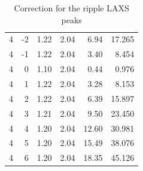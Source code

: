 \begin{table}[htbp]
\begin{tabular}{rrrrrr}
    4  & -2 & 1.22 & 2.04 & 6.94  & 17.265  \\
    4  & -1 & 1.22 & 2.04 & 3.40  & 8.454   \\
    4  & 0  & 1.10 & 2.04 & 0.44  & 0.976   \\
    4  & 1  & 1.22 & 2.04 & 3.28  & 8.153   \\
    4  & 2  & 1.22 & 2.04 & 6.39  & 15.897  \\
    4  & 3  & 1.21 & 2.04 & 9.50  & 23.450  \\
    4  & 4  & 1.20 & 2.04 & 12.60 & 30.981  \\
    4  & 5  & 1.20 & 2.04 & 15.49 & 38.076  \\
    4  & 6  & 1.20 & 2.04 & 18.35 & 45.126  \\
    \hline
    \end{tabular}%
  \caption{Correction for the ripple LAXS peaks} 
  \label{tab:LAXS_correction1}%
\end{table}%
    
